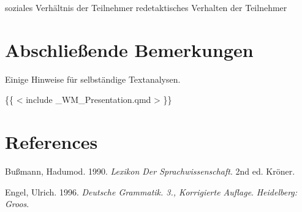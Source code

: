 \documentclass[
  letterpaper,
]{scrbook}
\newlength{\cslhangindent}
\newlength{\cslentryspacingunit} %
\newenvironment{CSLReferences}[2] %
 {%
  \setlength{\parindent}{0pt}
  \ifodd #1
  \let\oldpar\par
  \def\par{\hangindent=\cslhangindent\oldpar}
  \fi
  \setlength{\parskip}{#2\cslentryspacingunit}
 }%
 {}
\begin{document}
soziales Verhältnis der Teilnehmer redetaktisches Verhalten der
Teilnehmer


\hypertarget{abschlieuxdfende-bemerkungen}{%
\chapter{Abschließende Bemerkungen}\label{abschlieuxdfende-bemerkungen}}

Einige Hinweise für selbständige Textanalysen.

\{\{ \textless{} include \_WM\_Presentation.qmd \textgreater{} \}\}


\hypertarget{references}{%
\chapter*{References}\label{references}}

\hypertarget{refs}{}
\begin{CSLReferences}{1}{0}
\leavevmode{}%
Bußmann, Hadumod. 1990. \emph{Lexikon Der Sprachwissenschaft}. 2nd ed.
Kr{ö}ner.

\leavevmode{}%
Engel, Ulrich. 1996. \emph{Deutsche Grammatik. 3., Korrigierte Auflage}.
\emph{Heidelberg: Groos}.

\end{CSLReferences}


\backmatter

\printindex
\end{document}

